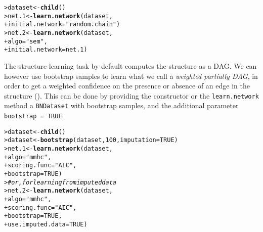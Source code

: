 \documentclass{article}\usepackage[]{graphicx}\usepackage[]{color}
\makeatletter
\newcommand{\hlnum}[1]{\textcolor[rgb]{0.686,0.059,0.569}{#1}}%
\newcommand{\hlstr}[1]{\textcolor[rgb]{0.192,0.494,0.8}{#1}}%
\newcommand{\hlcom}[1]{\textcolor[rgb]{0.678,0.584,0.686}{\textit{#1}}}%
\newcommand{\hlstd}[1]{\textcolor[rgb]{0.345,0.345,0.345}{#1}}%
\newcommand{\hlkwb}[1]{\textcolor[rgb]{0.69,0.353,0.396}{#1}}%
\newcommand{\hlkwc}[1]{\textcolor[rgb]{0.333,0.667,0.333}{#1}}%
\newcommand{\hlkwd}[1]{\textcolor[rgb]{0.737,0.353,0.396}{\textbf{#1}}}%
\newenvironment{kframe}{%
 \def\at@end@of@kframe{}%
 \ifinner\ifhmode%
  \def\at@end@of@kframe{\end{minipage}}%
  \begin{minipage}{\columnwidth}%
 \fi\fi%
 \def\FrameCommand##1{\hskip\@totalleftmargin \hskip-\fboxsep
 \colorbox{shadecolor}{##1}\hskip-\fboxsep
     \hskip-\linewidth \hskip-\@totalleftmargin \hskip\columnwidth}%
 \MakeFramed {\advance\hsize-\width
   \@totalleftmargin\z@ \linewidth\hsize
   \@setminipage}}%
 {\par\unskip\endMakeFramed%
 \at@end@of@kframe}
\newenvironment{knitrout}{}{} %
\newcommand{\Robject}[1]{{\texttt{#1}}}
\newcommand{\Rmethod}[1]{{\texttt{#1}}}
\newcommand{\Rfunarg}[1]{{\texttt{#1}}}
\makeatother
\begin{document}
\begin{knitrout}
\color{fgcolor}\begin{kframe}
\begin{alltt}
\hlstd{> }\hlstd{dataset} \hlkwb{<-} \hlkwd{child}\hlstd{()}
\hlstd{> }\hlstd{net.1}   \hlkwb{<-} \hlkwd{learn.network}\hlstd{(dataset,}
\hlstd{+ }                         \hlkwc{initial.network} \hlstd{=} \hlstr{"random.chain"}\hlstd{)}
\hlstd{> }\hlstd{net.2}   \hlkwb{<-} \hlkwd{learn.network}\hlstd{(dataset,}
\hlstd{+ }                         \hlkwc{algo} \hlstd{=} \hlstr{"sem"}\hlstd{,}
\hlstd{+ }                         \hlkwc{initial.network} \hlstd{= net.1)}
\end{alltt}
\end{kframe}
\end{knitrout}

The structure learning task by default computes the structure as a DAG. We can however use
bootstrap samples to learn what we call a \textit{weighted partially DAG}, in order to get a weighted confidence on the presence or
absence of an edge in the structure (\citet*{friedman1999data}). This can be done by providing the constructor or the \Rmethod{learn.network}
method a \Robject{BNDataset} with bootstrap samples, and the additional parameter \Rfunarg{bootstrap = TRUE}.

\begin{knitrout}
\color{fgcolor}\begin{kframe}
\begin{alltt}
\hlstd{> }\hlstd{dataset} \hlkwb{<-} \hlkwd{child}\hlstd{()}
\hlstd{> }\hlstd{dataset} \hlkwb{<-} \hlkwd{bootstrap}\hlstd{(dataset,} \hlnum{100}\hlstd{,} \hlkwc{imputation} \hlstd{=} \hlnum{TRUE}\hlstd{)}
\hlstd{> }\hlstd{net.1}   \hlkwb{<-} \hlkwd{learn.network}\hlstd{(dataset,}
\hlstd{+ }                         \hlkwc{algo} \hlstd{=} \hlstr{"mmhc"}\hlstd{,}
\hlstd{+ }                         \hlkwc{scoring.func} \hlstd{=} \hlstr{"AIC"}\hlstd{,}
\hlstd{+ }                         \hlkwc{bootstrap} \hlstd{=} \hlnum{TRUE}\hlstd{)}
\hlstd{> }\hlcom{# or, for learning from imputed data}
\hlstd{> }\hlstd{net.2}   \hlkwb{<-} \hlkwd{learn.network}\hlstd{(dataset,}
\hlstd{+ }                         \hlkwc{algo} \hlstd{=} \hlstr{"mmhc"}\hlstd{,}
\hlstd{+ }                         \hlkwc{scoring.func} \hlstd{=} \hlstr{"AIC"}\hlstd{,}
\hlstd{+ }                         \hlkwc{bootstrap} \hlstd{=} \hlnum{TRUE}\hlstd{,}
\hlstd{+ }                         \hlkwc{use.imputed.data} \hlstd{=} \hlnum{TRUE}\hlstd{)}
\end{alltt}
\end{kframe}
\end{knitrout}
\end{document}
